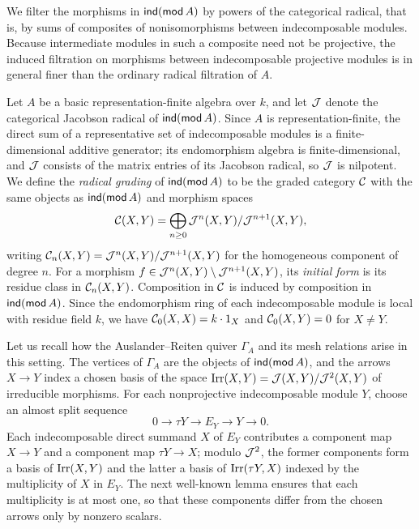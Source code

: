 We filter the morphisms in $\operatorname{\mathsf{ind}}(\operatorname{\mathsf{mod}} A)$ by powers of the categorical
radical, that is, by sums of composites of nonisomorphisms between
indecomposable modules. Because intermediate modules in such a composite need
not be projective, the induced filtration on morphisms between indecomposable
projective modules is in general finer than the ordinary radical filtration
of $A$.

Let $A$ be a basic representation-finite algebra over $k$, and let $\mathcal J$
denote the categorical Jacobson radical of $\operatorname{\mathsf{ind}}(\operatorname{\mathsf{mod}} A)$. Since $A$ is
representation-finite, the direct sum of a representative set of
indecomposable modules is a finite-dimensional additive generator; its
endomorphism algebra is finite-dimensional, and $\mathcal J$ consists of the matrix
entries of its Jacobson radical, so $\mathcal J$ is nilpotent. We define the
\emph{radical grading} of $\operatorname{\mathsf{ind}}(\operatorname{\mathsf{mod}} A)$ to be the graded category $\mathcal C$
with the same objects as $\operatorname{\mathsf{ind}}(\operatorname{\mathsf{mod}} A)$ and morphism spaces
\[
 \mathcal C(X,Y)=\bigoplus_{n\geq0}\mathcal J^n(X,Y)/\mathcal J^{n+1}(X,Y),
\]
writing $\mathcal C_n(X,Y)=\mathcal J^n(X,Y)/\mathcal J^{n+1}(X,Y)$ for the homogeneous component of
degree $n$. For a morphism $f\in \mathcal J^n(X,Y)\setminus \mathcal J^{n+1}(X,Y)$, its
\emph{initial form} is its residue class in $\mathcal C_n(X,Y)$. Composition in $\mathcal C$
is induced by composition in $\operatorname{\mathsf{ind}}(\operatorname{\mathsf{mod}} A)$. Since the endomorphism ring of
each indecomposable module is local with residue field $k$, we have
$\mathcal C_0(X,X)=k\cdot 1_X$ and $\mathcal C_0(X,Y)=0$ for $X\ne Y$.

Let us recall how the Auslander--Reiten quiver $\Gamma_A$ and its mesh
relations arise in this setting. The vertices of $\Gamma_A$ are the objects
of $\operatorname{\mathsf{ind}}(\operatorname{\mathsf{mod}} A)$, and the arrows $X\to Y$ index a chosen basis of the
space $\operatorname{Irr}(X,Y)=\mathcal J(X,Y)/\mathcal J^2(X,Y)$ of irreducible morphisms. For each
nonprojective indecomposable module $Y$, choose an almost split sequence
\[
 0\longrightarrow\tau Y\longrightarrow E_Y
   \longrightarrow Y\longrightarrow0.
\]
Each indecomposable direct summand $X$ of $E_Y$ contributes a component map
$X\to Y$ and a component map $\tau Y\to X$; modulo $\mathcal J^2$, the former
components form a basis of $\operatorname{Irr}(X,Y)$ and the latter a basis of
$\operatorname{Irr}(\tau Y,X)$ indexed by the multiplicity of $X$ in $E_Y$. The next
well-known lemma ensures that each multiplicity is at most one, so that these
components differ from the chosen arrows only by nonzero scalars.

